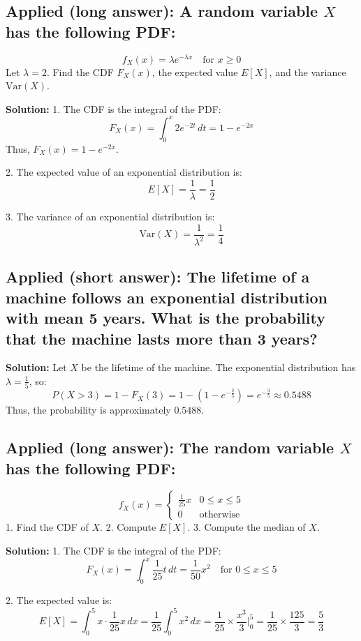 \documentclass[12pt]{article}
\begin{document}
\subsection{Applied (long answer): A random variable \( X \) has the following PDF:}
\[
f_X(x) = \lambda e^{-\lambda x} \quad \text{for } x \geq 0
\]
Let \( \lambda = 2 \). Find the CDF \( F_X(x) \), the expected value \( E[X] \), and the variance \( \text{Var}(X) \).

\textbf{Solution:}  
1. The CDF is the integral of the PDF:
\[
F_X(x) = \int_0^x 2e^{-2t} \, dt = 1 - e^{-2x}
\]
Thus, \( F_X(x) = 1 - e^{-2x} \).

2. The expected value of an exponential distribution is:
\[
E[X] = \frac{1}{\lambda} = \frac{1}{2}
\]

3. The variance of an exponential distribution is:
\[
\text{Var}(X) = \frac{1}{\lambda^2} = \frac{1}{4}
\]

\subsection{Applied (short answer): The lifetime of a machine follows an exponential distribution with mean 5 years. What is the probability that the machine lasts more than 3 years?}

\textbf{Solution:}  
Let \( X \) be the lifetime of the machine. The exponential distribution has \( \lambda = \frac{1}{5} \), so:
\[
P(X > 3) = 1 - F_X(3) = 1 - (1 - e^{-\frac{3}{5}}) = e^{-\frac{3}{5}} \approx 0.5488
\]
Thus, the probability is approximately \( 0.5488 \).

\subsection{Applied (long answer): The random variable \( X \) has the following PDF:}
\[
f_X(x) = 
\begin{cases}
\frac{1}{25}x & 0 \leq x \leq 5 \\
0 & \text{otherwise}
\end{cases}
\]
1. Find the CDF of \( X \).  
2. Compute \( E[X] \).  
3. Compute the median of \( X \).

\textbf{Solution:}  
1. The CDF is the integral of the PDF:
\[
F_X(x) = \int_0^x \frac{1}{25} t \, dt = \frac{1}{50} x^2 \quad \text{for } 0 \leq x \leq 5
\]

2. The expected value is:
\[
E[X] = \int_0^5 x \cdot \frac{1}{25} x \, dx = \frac{1}{25} \int_0^5 x^2 \, dx = \frac{1}{25} \times \frac{x^3}{3} \Bigg|_0^5 = \frac{1}{25} \times \frac{125}{3} = \frac{5}{3}
\]
\end{document}
